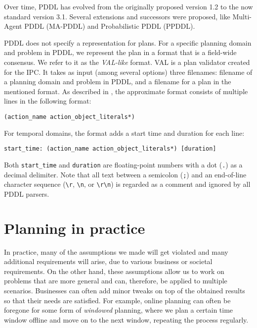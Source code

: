 Over time, PDDL has evolved from the originally proposed version 1.2
to the now standard version 3.1. Several extensions and successors were proposed,
like Multi-Agent PDDL
(MA-PDDL) and
Probabilistic PDDL
(PPDDL).

PDDL does not specify a representation for plans. For a specific planning domain and problem in PDDL,
we represent the plan in a format that is a field-wide consensus. We refer to it
as the \textit{VAL-like} format. VAL \citep{Howey2003} is a plan validator created for the IPC.
It takes as input (among several options) three filenames: filename of a planning domain and
problem in PDDL, and a filename for a plan in the mentioned format.
As described in \citet[Figure~2]{Howey2003}, the approximate format
consists of multiple lines in the following format:
\begin{center}
\verb+(action_name action_object_literals*)+
\end{center}
For temporal domains, the format adds a start time and duration for each line:
\begin{center}
\verb+start_time: (action_name action_object_literals*) [duration]+
\end{center}
Both \verb+start_time+ and \verb+duration+ are floating-point numbers with a dot
(\verb+.+) as a decimal delimiter.
Note that all text between a semicolon (\verb+;+) and an end-of-line character sequence (\verb+\r+, \verb+\n+, or \verb+\r\n+) is regarded as a comment and ignored by all PDDL parsers.







\section{Planning in practice}

In practice, many of the assumptions we made will get violated and many additional requirements will arise,
due to various business or societal requirements.
On the other hand, these assumptions allow us to work
on problems that are more general and can, therefore, be applied to multiple scenarios.
Businesses can often add minor tweaks on top of the obtained results so that
their needs are satisfied. 
For example, online planning can often be foregone for some form of \textit{windowed} planning,
where we plan a certain time window offline and move on to the next window,
repeating the process regularly.

